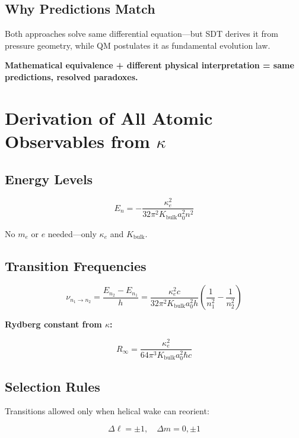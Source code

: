 \subsection{Why Predictions Match}

Both approaches solve same differential equation—but SDT derives it from pressure geometry, while QM postulates it as fundamental evolution law.

\textbf{Mathematical equivalence + different physical interpretation = same predictions, resolved paradoxes.}

\section{Derivation of All Atomic Observables from $\kappa$}

\subsection{Energy Levels}

\begin{equation}
E_n = -\frac{\kappa_e^2}{32\pi^2 K_{\text{bulk}} a_0^2 n^2}
\end{equation}

No $m_e$ or $e$ needed—only $\kappa_e$ and $K_{\text{bulk}}$.

\subsection{Transition Frequencies}

\begin{equation}
\nu_{n_1 \to n_2} = \frac{E_{n_2} - E_{n_1}}{h} = \frac{\kappa_e^2 c}{32\pi^2 K_{\text{bulk}} a_0^2 h} \left(\frac{1}{n_1^2} - \frac{1}{n_2^2}\right)
\end{equation}

\textbf{Rydberg constant from $\kappa$:}

\begin{equation}
R_\infty = \frac{\kappa_e^2}{64\pi^3 K_{\text{bulk}} a_0^2 \hbar c}
\end{equation}

\subsection{Selection Rules}

Transitions allowed only when helical wake can reorient:

\begin{equation}
\Delta \ell = \pm 1, \quad \Delta m = 0, \pm 1
\end{equation}

